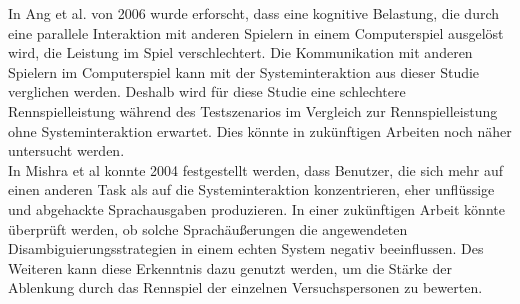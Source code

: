 \documentclass[12pt,a4paper]{scrartcl}
\begin{document}
In Ang et al. von 2006 wurde erforscht, dass eine kognitive Belastung, die durch eine parallele Interaktion mit anderen Spielern in einem Computerspiel ausgelöst wird, die Leistung im Spiel verschlechtert.  Die Kommunikation mit anderen Spielern im Computerspiel kann mit der Systeminteraktion aus dieser Studie verglichen werden. Deshalb wird für diese Studie eine schlechtere Rennspielleistung während des Testszenarios im Vergleich zur Rennspielleistung ohne Systeminteraktion erwartet. Dies könnte in zukünftigen Arbeiten noch näher untersucht werden.\\
 In Mishra et al konnte 2004 festgestellt werden, dass Benutzer, die sich mehr auf einen anderen Task als auf die Systeminteraktion konzentrieren, eher unflüssige und abgehackte Sprachausgaben produzieren. In einer zukünftigen Arbeit könnte überprüft werden, ob solche Sprachäußerungen die angewendeten Disambiguierungsstrategien in einem echten System negativ beeinflussen.
Des Weiteren kann diese Erkenntnis dazu genutzt werden, um die Stärke der Ablenkung durch das Rennspiel der einzelnen Versuchspersonen zu bewerten. 
\end{document}

